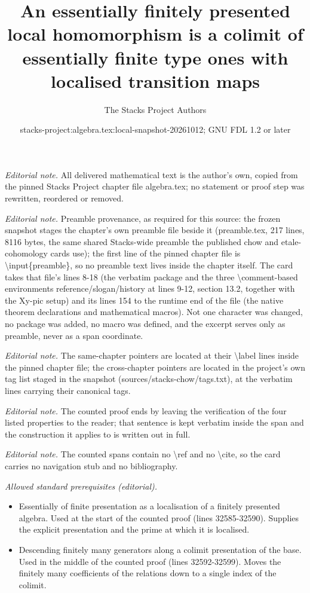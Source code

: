 \documentclass[10pt,a4paper]{amsart}
\title{An essentially finitely presented local homomorphism is a colimit of essentially finite type ones with localised transition maps}
\author{The Stacks Project Authors}
\date{stacks-project:algebra.tex:local-snapshot-20261012; GNU FDL 1.2 or later}
\theoremstyle{plain}
\theoremstyle{definition}
\theoremstyle{remark}
\numberwithin{equation}{subsection}
\begin{document}
\maketitle
\noindent\textit{Editorial note.} All delivered mathematical text is the author's own, copied from the pinned Stacks Project chapter file algebra.tex; no statement or proof step was rewritten, reordered or removed.\par\medskip
\noindent\textit{Editorial note.} Preamble provenance, as required for this source: the frozen snapshot stages the chapter's own preamble file beside it (preamble.tex, 217 lines, 8116 bytes, the same shared Stacks-wide preamble the published chow and etale-cohomology cards use); the first line of the pinned chapter file is \textbackslash{}input\{preamble\}, so no preamble text lives inside the chapter itself. The card takes that file's lines 8-18 (the verbatim package and the three \textbackslash{}comment-based environments reference/slogan/history at lines 9-12, section 13.2, together with the Xy-pic setup) and its lines 154 to the runtime end of the file (the native theorem declarations and mathematical macros). Not one character was changed, no package was added, no macro was defined, and the excerpt serves only as preamble, never as a span coordinate.\par\medskip
\noindent\textit{Editorial note.} The same-chapter pointers are located at their \textbackslash{}label lines inside the pinned chapter file; the cross-chapter pointers are located in the project's own tag list staged in the snapshot (sources/stacks-chow/tags.txt), at the verbatim lines carrying their canonical tags.\par\medskip
\noindent\textit{Editorial note.} The counted proof ends by leaving the verification of the four listed properties to the reader; that sentence is kept verbatim inside the span and the construction it applies to is written out in full.\par\medskip
\noindent\textit{Editorial note.} The counted spans contain no \textbackslash{}ref and no \textbackslash{}cite, so the card carries no navigation stub and no bibliography.\par\medskip
\noindent\textit{Allowed standard prerequisites (editorial).}\begin{itemize}
\item Essentially of finite presentation as a localisation of a finitely presented algebra. Used at the start of the counted proof (lines 32585-32590). Supplies the explicit presentation and the prime at which it is localised.
\item Descending finitely many generators along a colimit presentation of the base. Used in the middle of the counted proof (lines 32592-32599). Moves the finitely many coefficients of the relations down to a single index of the colimit.
\end{itemize}\medskip
\end{document}
